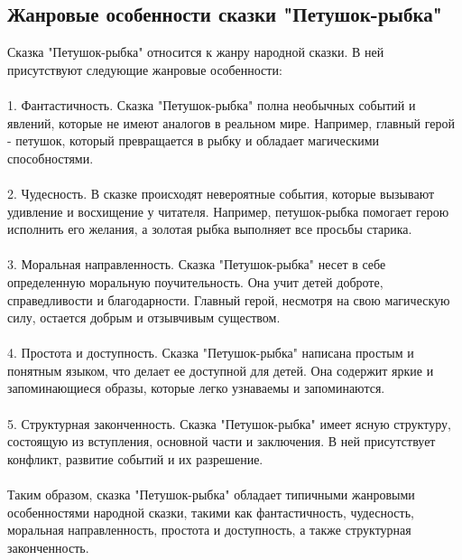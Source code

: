 \documentclass{article}
\begin{document}
\subsection{Жанровые особенности сказки "{}{}Петушок-рыбка"{}{}}
Сказка "{}{}Петушок-рыбка"{}{} относится к жанру народной сказки. В ней присутствуют следующие жанровые особенности:\\
~\\
1. Фантастичность. Сказка "{}{}Петушок-рыбка"{}{} полна необычных событий и явлений, которые не имеют аналогов в реальном мире. Например, главный герой - петушок, который превращается в рыбку и обладает магическими способностями.\\
~\\
2. Чудесность. В сказке происходят невероятные события, которые вызывают удивление и восхищение у читателя. Например, петушок-рыбка помогает герою исполнить его желания, а золотая рыбка выполняет все просьбы старика.\\
~\\
3. Моральная направленность. Сказка "{}{}Петушок-рыбка"{}{} несет в себе определенную моральную поучительность. Она учит детей доброте, справедливости и благодарности. Главный герой, несмотря на свою магическую силу, остается добрым и отзывчивым существом.\\
~\\
4. Простота и доступность. Сказка "{}{}Петушок-рыбка"{}{} написана простым и понятным языком, что делает ее доступной для детей. Она содержит яркие и запоминающиеся образы, которые легко узнаваемы и запоминаются.\\
~\\
5. Структурная законченность. Сказка "{}{}Петушок-рыбка"{}{} имеет ясную структуру, состоящую из вступления, основной части и заключения. В ней присутствует конфликт, развитие событий и их разрешение.\\
~\\
Таким образом, сказка "{}{}Петушок-рыбка"{}{} обладает типичными жанровыми особенностями народной сказки, такими как фантастичность, чудесность, моральная направленность, простота и доступность, а также структурная законченность.
\end{document}
